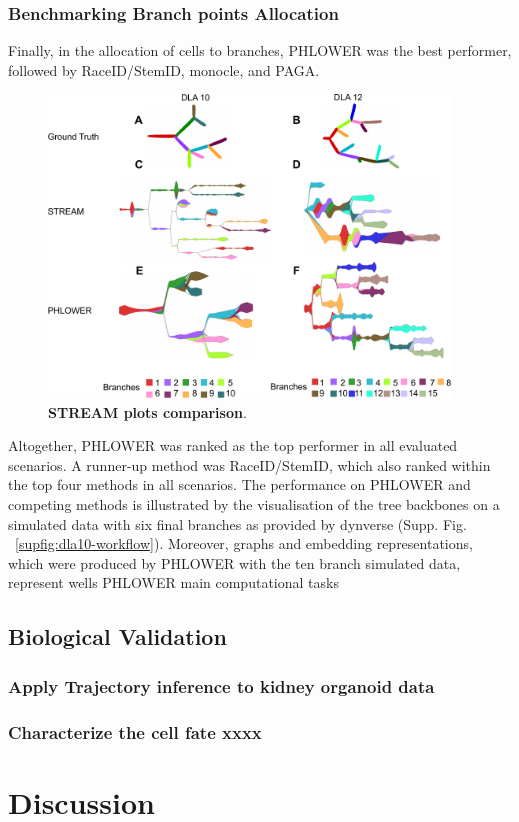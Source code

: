 \subsubsection{Benchmarking Branch points Allocation}
Finally, in the allocation of cells to branches, PHLOWER was the best performer, followed by RaceID/StemID, monocle, and PAGA.
\begin{figure}[!ht]
	\centering
	\includegraphics[width=0.95\textwidth]{PHLOWER_STREAM_layout/fig}
	\vspace{0.1cm}
	\caption[STREAM plots comparison]{
	\textbf{STREAM plots comparison}.}
	\label{fig:PHLOWER_STREAM}
\end{figure}

Altogether, PHLOWER was ranked as the top performer in all evaluated scenarios. A runner-up method was RaceID/StemID, which also ranked within the top four methods in all scenarios. The performance on PHLOWER and competing methods is illustrated by the visualisation of the tree backbones on a simulated data with six final branches as provided by dynverse (Supp. Fig. ~\ref{supfig:dla10-workflow}). Moreover, graphs and embedding representations, which were produced by PHLOWER with the ten branch simulated data, represent wells PHLOWER main computational tasks

\subsection{Biological Validation}
\subsubsection{Apply Trajectory inference to kidney organoid data}
\subsubsection{Characterize the cell fate xxxx}
\section{Discussion}


